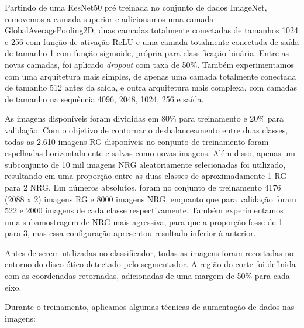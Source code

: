 \documentclass[12pt]{article}
\begin{document}
Partindo de uma ResNet50 pré treinada no conjunto de dados ImageNet, removemos a camada superior e adicionamos uma camada GlobalAveragePooling2D, duas camadas totalmente conectadas de tamanhos 1024 e 256 com função de ativação ReLU e uma camada totalmente conectada de saída de tamanho 1 com função sigmoide, própria para classificação binária. Entre as novas camadas, foi aplicado \emph{dropout} com taxa de 50\%. Também experimentamos com uma arquitetura mais simples, de apenas uma camada totalmente conectada de tamanho 512 antes da saída, e outra arquitetura mais complexa, com camadas de tamanho na sequência 4096, 2048, 1024, 256 e saída.

As imagens disponíveis foram divididas em 80\% para treinamento e 20\% para validação. Com o objetivo de contornar o desbalanceamento entre duas classes, todas as 2.610 imagens RG disponíveis no conjunto de treinamento foram espelhadas horizontalmente e salvas como novas imagens. Além disso, apenas um subconjunto de 10 mil imagens NRG aleatoriamente selecionadas foi utilizado, resultando em uma proporção entre as duas classes de aproximadamente 1 RG para 2 NRG. Em números absolutos, foram no conjunto de treinamento 4176 (2088 x 2) imagens RG e 8000 imagens NRG, enquanto que para validação foram 522 e 2000 imagens de cada classe respectivamente. Também experimentamos uma subamostragem de NRG mais agressiva, para que a proporção fosse de 1 para 3, mas essa configuração apresentou resultado inferior à anterior.

Antes de serem utilizadas no classificador, todas as imagens foram recortadas no entorno do disco ótico detectado pelo segmentador. A região do corte foi definida com as coordenadas retornadas, adicionadas de uma margem de 50\% para cada eixo.


Durante o treinamento, aplicamos algumas técnicas de aumentação de dados nas imagens:
\end{document}
